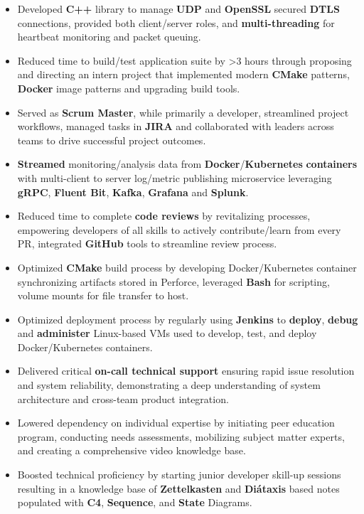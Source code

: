 \documentclass[a4paper]{article}
\begin{document}
\begin{itemize}
	\item Developed \textbf{C++} library to manage \textbf{UDP} and \textbf{OpenSSL} secured \textbf{DTLS} connections, provided both client/server roles, and \textbf{multi-threading} for heartbeat monitoring and packet queuing.
	\item Reduced time to build/test application suite by >3 hours through proposing and directing an intern project that implemented modern \textbf{CMake} patterns, \textbf{Docker} image patterns and upgrading build tools.
	\item Served as \textbf{Scrum Master}, while primarily a developer, streamlined project workflows, managed tasks in \textbf{JIRA} and collaborated with leaders across teams to drive successful project outcomes.
	\item \textbf{Streamed} monitoring/analysis data from \textbf{Docker}/\textbf{Kubernetes} \textbf{containers} with multi-client to server log/metric publishing microservice leveraging \textbf{gRPC}, \textbf{Fluent Bit}, \textbf{Kafka}, \textbf{Grafana} and \textbf{Splunk}.
	\item Reduced time to complete \textbf{code reviews} by revitalizing processes, empowering developers of all skills to actively contribute/learn from every PR, integrated \textbf{GitHub} tools to streamline review process.
	\item Optimized \textbf{CMake} build process by developing Docker/Kubernetes container synchronizing artifacts stored in Perforce, leveraged \textbf{Bash} for scripting, volume mounts for file transfer to host.
	\item Optimized deployment process by regularly using \textbf{Jenkins} to \textbf{deploy}, \textbf{debug} and \textbf{administer} Linux-based VMs used to develop, test, and deploy Docker/Kubernetes containers.
	\item Delivered critical \textbf{on-call technical support} ensuring rapid issue resolution and system reliability, demonstrating a deep understanding of system architecture and cross-team product integration.
	\item Lowered dependency on individual expertise by initiating peer education program, conducting needs assessments, mobilizing subject matter experts, and creating a comprehensive video knowledge base.
	\item Boosted technical proficiency by starting junior developer skill-up sessions resulting in a knowledge base of \textbf{Zettelkasten} and \textbf{Diátaxis} based notes populated with \textbf{C4}, \textbf{Sequence}, and \textbf{State} Diagrams.

\end{itemize}
\end{document}
